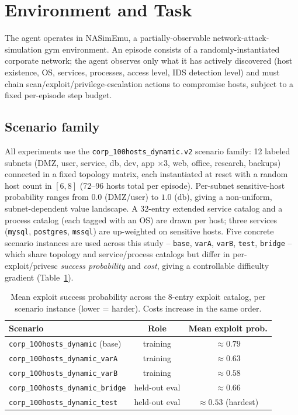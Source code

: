 \documentclass[11pt]{article}
\newcommand{\code}[1]{\texttt{#1}}
\begin{document}
\section{Environment and Task}
\label{sec:env}

The agent operates in NASimEmu, a partially-observable network-attack-simulation
gym environment. An episode consists of a randomly-instantiated corporate network;
the agent observes only what it has actively discovered (host existence, OS,
services, processes, access level, IDS detection level) and must chain
scan/exploit/privilege-escalation actions to compromise hosts, subject to a fixed
per-episode step budget.

\subsection{Scenario family}
All experiments use the \code{corp\_100hosts\_dynamic.v2} scenario family: 12
labeled subnets (DMZ, user, service, db, dev, app $\times$3, web, office, research,
backups) connected in a fixed topology matrix, each instantiated at reset with a
random host count in $[6,8]$ (72--96 hosts total per episode). Per-subnet
sensitive-host probability ranges from $0.0$ (DMZ/user) to $1.0$ (db), giving a
non-uniform, subnet-dependent value landscape. A 32-entry extended service catalog
and a process catalog (each tagged with an OS) are drawn per host; three services
(\code{mysql}, \code{postgres}, \code{mssql}) are up-weighted on sensitive hosts.
Five concrete scenario instances are used across this study -- \code{base},
\code{varA}, \code{varB}, \code{test}, \code{bridge} -- which share topology and
service/process catalogs but differ in per-exploit/privesc \emph{success
probability} and \emph{cost}, giving a controllable difficulty gradient
(Table~\ref{tab:scenario-difficulty}).

\begin{table}[H]
\centering
\caption{Mean exploit success probability across the 8-entry exploit catalog, per
scenario instance (lower = harder). Costs increase in the same order.}
\label{tab:scenario-difficulty}
\begin{tabular}{lcc}
\toprule
Scenario & Role & Mean exploit prob.\\
\midrule
\code{corp\_100hosts\_dynamic} (base) & training & $\approx 0.79$ \\
\code{corp\_100hosts\_dynamic\_varA} & training & $\approx 0.63$ \\
\code{corp\_100hosts\_dynamic\_varB} & training & $\approx 0.58$ \\
\code{corp\_100hosts\_dynamic\_bridge} & held-out eval & $\approx 0.66$ \\
\code{corp\_100hosts\_dynamic\_test} & held-out eval & $\approx 0.53$ (hardest) \\
\bottomrule
\end{tabular}
\end{table}
\end{document}
